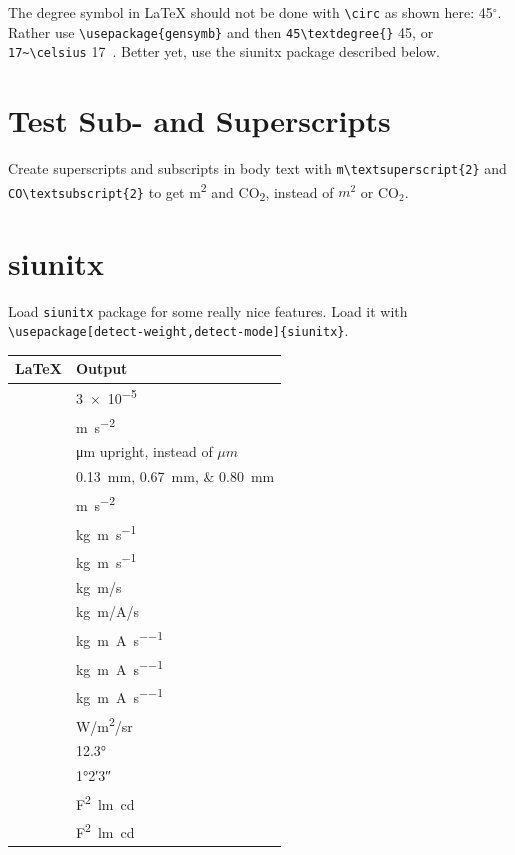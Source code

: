 \documentclass[english]{workpackage}[1996/06/02]
\begin{document}
The degree symbol in \LaTeX{} should not be done with \verb+\circ+ as shown here: 45$^\circ$. 
Rather use \verb+\usepackage{gensymb}+ and then \verb+45\textdegree{}+ 45\textdegree{}, or \verb+17~\celsius+ 17~\celsius. Better yet, use the siunitx package described below.
\section{Test Sub- and Superscripts}
\label{sec:TestSubandSuperscripts}

Create superscripts and subscripts in body text with \verb+m\textsuperscript{2}+ and \verb+CO\textsubscript{2}+ to get  m\textsuperscript{2} and CO\textsubscript{2}, instead of $m^2$ or CO$_2$.
\section{siunitx}
\label{sec:siunitx}

Load \verb+siunitx+  package for  some really nice features. Load it with \\
\verb+\usepackage[detect-weight,detect-mode]{siunitx}+.

\newcommand{\tabentry}[1]{\detokenize{#1} & #1}

\begin{tabular}{p{110mm}|l}
\textbf{\LaTeX{}} & \textbf{Output}\\\hline
\tabentry{\num{3e-5}}\\
\tabentry{\si{\metre\per\second\squared}}\\
\tabentry{\si{\micro\metre}} upright,  instead of $\mu m$\\
\tabentry{\SIlist{0.13;0.67;0.80}{\milli\metre}}\\
\tabentry{\si{\metre\per\second\squared}}\\
\tabentry{\si{kg.m.s^{-1}}}\\
\tabentry{\si{\kilogram\metre\per\second}}\\
\tabentry{\si[per-mode=symbol]{\kilogram\metre\per\second}}\\
\tabentry{\si[per-mode=symbol]{\kilogram\metre\per\ampere\per\second}}\\
\tabentry{\si[per-mode=reciprocal]{\kilogram\metre\per\ampere\per\second}}\\
\tabentry{\si{\kilogram\metre\per\ampere\per\second}}\\
\tabentry{\si[per-mode=fraction]{\kilogram\metre\per\ampere\per\second}}\\
\tabentry{\si[per-mode=symbol]{\watt\per\metre\squared\per \steradian}}\\
\tabentry{\ang{12.3}}\\
\tabentry{\ang{1;2;3}}\\
\tabentry{\si{\farad\squared\lumen\candela}}\\
\tabentry{\si[inter-unit-product = \ensuremath{{}\cdot{}}]{\farad\squared\lumen\candela}}\\
\end{tabular}
\end{document}
